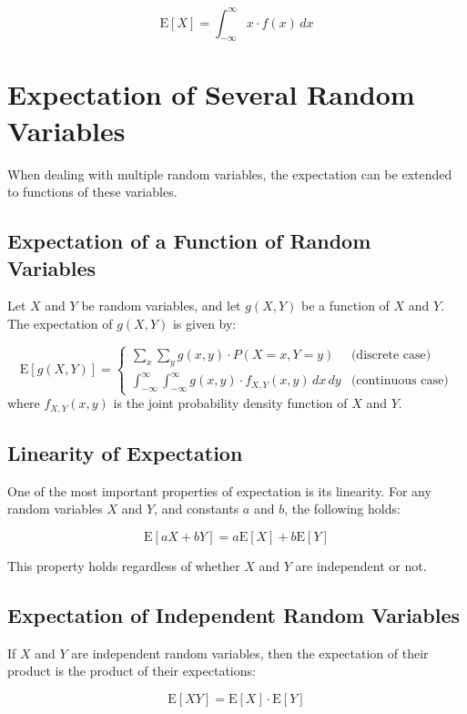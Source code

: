 \documentclass{tufte-handout}
\begin{document}
\[
\mathrm{E}[X] = \int_{-\infty}^{\infty} x \cdot f(x) \, dx
\]

\section*{Expectation of Several Random Variables}

When dealing with multiple random variables, the expectation can be extended to functions of these variables.

\subsection*{Expectation of a Function of Random Variables}

Let \( X \) and \( Y \) be random variables, and let \( g(X, Y) \) be a function of \( X \) and \( Y \). The expectation of \( g(X, Y) \) is given by:

\[
\mathrm{E}[g(X, Y)] = \begin{cases}
\sum_{x} \sum_{y} g(x, y) \cdot P(X = x, Y = y) & \text{(discrete case)} \\
\int_{-\infty}^{\infty} \int_{-\infty}^{\infty} g(x, y) \cdot f_{X,Y}(x, y) \, dx \, dy & \text{(continuous case)}
\end{cases}
\]
where \( f_{X,Y}(x, y) \) is the joint probability density function of \( X \) and \( Y \).

\subsection*{Linearity of Expectation}

One of the most important properties of expectation is its linearity. For any random variables \( X \) and \( Y \), and constants \( a \) and \( b \), the following holds:

\[
\mathrm{E}[aX + bY] = a\mathrm{E}[X] + b\mathrm{E}[Y]
\]

This property holds regardless of whether \( X \) and \( Y \) are independent or not.

\subsection*{Expectation of Independent Random Variables}

If \( X \) and \( Y \) are {independent} random variables, then the expectation of their product is the product of their expectations:

\[
\mathrm{E}[XY] = \mathrm{E}[X] \cdot \mathrm{E}[Y]
\]
\end{document}
